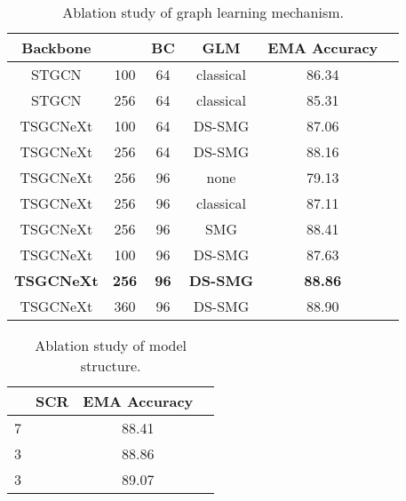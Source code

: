 \documentclass[10pt,twocolumn,letterpaper]{article}
\begin{document}
\begin{table}[htp]
  \centering
  \setlength{\abovecaptionskip}{0pt}
  \caption{Ablation study of graph learning mechanism.}
  \setlength{\belowcaptionskip}{0pt}
    \begin{tabular}{cccccc}
    \toprule Backbone &  & BC & GLM &EMA Accuracy\\
    \midrule STGCN    & 100 &64     & classical & 86.34\\
    STGCN    & 256 &64     & classical & 85.31\\
TSGCNeXt &100  &64     & DS-SMG & 87.06\\
    TSGCNeXt &256  &64     & DS-SMG & 88.16\\
    \midrule
    TSGCNeXt &256  &96     & none   & 79.13\\
    TSGCNeXt &256  &96     & classical & 87.11\\
    TSGCNeXt &256  &96     & SMG    & 88.41\\
    \midrule
    TSGCNeXt &100  &96     & DS-SMG & 87.63\\
    \textbf{TSGCNeXt} &\textbf{256}  &\textbf{96 }    & \textbf{DS-SMG} &  \textbf{88.86}\\
    TSGCNeXt &360  &96     & DS-SMG & 88.90\\
    \bottomrule \end{tabular}\label{tab:Ablation Study2}\vspace{-1em}
\end{table}\begin{table}[htp]
  \centering
  \caption{Ablation study of model structure.}
    \begin{tabular}{cccc}
    \toprule  & SCR &EMA Accuracy\\
    \midrule 7         &  & 88.41\\
    3         &  & 88.86\\
    3         &  & 89.07\\
    \bottomrule \end{tabular}\label{tab:Ablation Studyl}\vspace{-1em}
\end{table}
\end{document}
